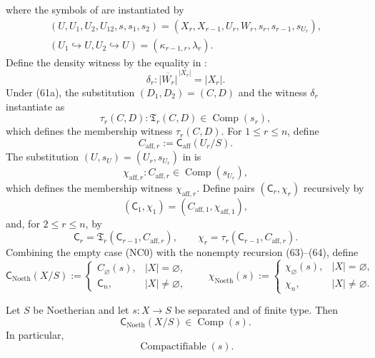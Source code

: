 \begin{definition}
\[  \]
  where the symbols of
   are instantiated by
  \[
  \begin{gathered}
    (U,U_1,U_2,U_{12},s,s_1,s_2)
      =(X_r,X_{r-1},U_r,W_r,s_r,s_{r-1},s_{U_r}),\\
    (U_1\hookrightarrow U,U_2\hookrightarrow U)
      =(\kappa_{r-1,r},\lambda_r).
  \end{gathered}                                                  \tag{61a}
  \]
  Define the density witness by the equality in
  :
  \[
    \delta_r\colon\overline{|W_r|}^{\,|X_r|}=|X_r|.              \tag{61b}
  \]
  Under (61a), the substitution $(D_1,D_2)=(C,D)$ and the witness
  $\delta_r$ instantiate  as
  \[
    \tau_r(C,D)\colon
      \mathfrak T_r(C,D)\in\operatorname{Comp}(s_r),              \tag{62}
  \]
  which defines the membership witness $\tau_r(C,D)$.
  For $1\leq r\leq n$, define
  \[
    C_{\mathrm{aff},r}:=\mathsf C_{\mathrm{aff}}(U_r/S).
  \]
  The substitution $(U,s_U)=(U_r,s_{U_r})$ in
   is
  \[
    \chi_{\mathrm{aff},r}\colon
      C_{\mathrm{aff},r}\in\operatorname{Comp}(s_{U_r}),        \tag{62a}
  \]
  which defines the membership witness $\chi_{\mathrm{aff},r}$.  Define pairs
  $(\mathsf C_r,\chi_r)$ recursively by
  \[
    (\mathsf C_1,\chi_1)
      =(C_{\mathrm{aff},1},\chi_{\mathrm{aff},1}),                 \tag{63}
  \]
  and, for $2\leq r\leq n$, by
  \[
    \mathsf C_r
      =\mathfrak T_r(\mathsf C_{r-1},C_{\mathrm{aff},r}),\qquad
    \chi_r
      =\tau_r(\mathsf C_{r-1},C_{\mathrm{aff},r}).                 \tag{64}
  \]
  Combining the empty case (NC0) with the nonempty recursion (63)--(64),
  define
  \[
    \mathsf C_{\mathrm{Noeth}}(X/S):=
    \begin{cases}
      C_\varnothing(s),&|X|=\varnothing,\\
      \mathsf C_n,&|X|\neq\varnothing,
    \end{cases}
    \qquad
    \chi_{\mathrm{Noeth}}(s):=
    \begin{cases}
      \chi_\varnothing(s),&|X|=\varnothing,\\
      \chi_n,&|X|\neq\varnothing.
    \end{cases}                                                    \tag{65}
  \]
\end{definition}

\begin{theorem}
  \label{thm:nagata-noetherian}

  Let $S$ be Noetherian and let $s\colon X\to S$ be separated and of finite
  type.  Then
  \[
    \mathsf C_{\mathrm{Noeth}}(X/S)
      \in\operatorname{Comp}(s).
  \]
  In particular,
  \[
    \operatorname{Compactifiable}(s).
  \]
\end{theorem}

